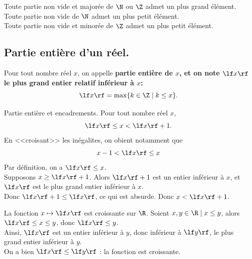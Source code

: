 \documentclass[11pt]{article}
\begin{document}
\begin{prop}{}{}
    Toute partie non vide et majorée de $\N$ ou $\Z$ admet un plus grand élément.\\
    Toute partie non vide de $\N$ admet un plus petit élément.\\
    Toute partie non vide et minorée de $\Z$ admet un plus petit élément.
\end{prop}

\subsection{Partie entière d'un réel.}

\begin{defi}{}{}
    Pour tout nombre réel $x$, on appelle \bf{partie entière} de $x$, et on note $\lf x \rf$ le plus grand entier relatif inférieur à $x$:
    \begin{equation*}
        \lf x \rf = \max\{k\in\Z\mid k\leq x\}.
    \end{equation*}
\end{defi}

\begin{prop}{Partie entière et encadrements.}{}
    Pour tout nombre réel $x$,
    \begin{equation*}
        \lf x \rf \leq x < \lf x \rf + 1.
    \end{equation*}    
    En <<croisant>> les inégalites, on obient notamment que
    \begin{equation*}
        x-1<\lf x \rf \leq x
    \end{equation*}
    \tcblower
    Par définition, on a $\lf x \rf \leq x$.\\
    Supposons $x\geq\lf x \rf + 1$. Alors $\lf x \rf + 1$ est un entier inférieur à $x$, et $\lf x \rf$ est le plus grand entier inférieur à $x$.\\
    Donc $\lf x \rf + 1 \leq \lf x \rf$, ce qui est absurde. Donc $x<\lf x \rf + 1$.
\end{prop}

\begin{prop}{}{}
    La fonction $x\mapsto\lf x \rf$ est croissante sur $\R$.
    \tcblower
    Soient $x,y\in\R\mid x\leq y$, alors $\lf x \rf \leq x \leq y$, donc $\lf x \rf \leq y$.\\
    Ainsi, $\lf x \rf$ est un entier inférieur à $y$, donc inférieur à $\lf y \rf$, le plus grand entier inférieur à $y$.\\
    On a bien $\lf x \rf \leq \lf y \rf$ : la fonction est croissante.
\end{prop}
\end{document}
